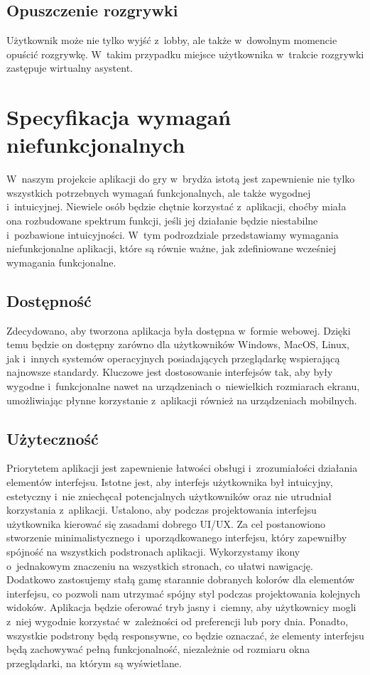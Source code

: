 \subsection{Opuszczenie rozgrywki}
Użytkownik może nie tylko wyjść z~lobby, ale także w~dowolnym momencie
opuścić rozgrywkę. W~takim przypadku miejsce użytkownika w~trakcie
rozgrywki zastępuje wirtualny asystent.




\section{Specyfikacja wymagań niefunkcjonalnych}
W~naszym projekcie aplikacji do gry w~brydża
istotą jest zapewnienie nie tylko wszystkich potrzebnych wymagań
funkcjonalnych, ale także wygodnej i~intuicyjnej. Niewiele osób
będzie chętnie korzystać z~aplikacji, choćby miała ona rozbudowane
spektrum funkcji, jeśli jej działanie będzie niestabilne i~pozbawione
intuicyjności. W~tym podrozdziale przedstawiamy wymagania
niefunkcjonalne aplikacji, które są równie ważne, jak zdefiniowane
wcześniej wymagania funkcjonalne.


\subsection{Dostępność}
Zdecydowano, aby tworzona aplikacja była dostępna w~formie webowej.
Dzięki temu będzie on dostępny zarówno dla użytkowników
Windows, MacOS, Linux, jak i~innych systemów operacyjnych posiadających
przeglądarkę wspierającą najnowsze standardy.
Kluczowe jest dostosowanie interfejsów tak,
aby były wygodne i~funkcjonalne nawet na urządzeniach o~niewielkich
rozmiarach ekranu, umożliwiając płynne korzystanie z~aplikacji również
na urządzeniach mobilnych.


\subsection{Użyteczność}
Priorytetem aplikacji jest zapewnienie łatwości obsługi
i~zrozumiałości działania elementów interfejsu.
Istotne jest, aby interfejs użytkownika
był intuicyjny, estetyczny i~nie zniechęcał potencjalnych użytkowników
oraz nie utrudniał korzystania z~aplikacji. Ustalono, aby podczas
projektowania interfejsu użytkownika kierować się zasadami
dobrego UI/UX.
Za cel postanowiono stworzenie minimalistycznego i~uporządkowanego
interfejsu, który zapewniłby spójność na wszystkich podstronach aplikacji.
Wykorzystamy ikony o~jednakowym znaczeniu na wszystkich stronach,
co ułatwi nawigację. Dodatkowo zastosujemy stałą gamę starannie
dobranych kolorów dla elementów interfejsu, co pozwoli nam utrzymać
spójny styl podczas projektowania kolejnych widoków. Aplikacja
będzie oferować tryb jasny i~ciemny, aby użytkownicy mogli z~niej
wygodnie korzystać w~zależności od preferencji lub pory dnia.
Ponadto, wszystkie podstrony będą responsywne, co będzie oznaczać,
że elementy interfejsu będą zachowywać pełną funkcjonalność,
niezależnie od rozmiaru okna przeglądarki, na którym są wyświetlane.

